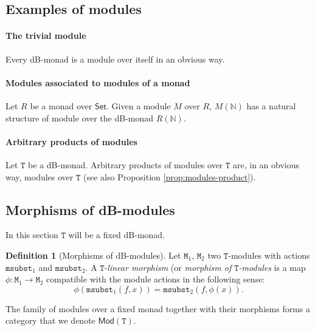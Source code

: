 \documentclass[a4paper,twoside,12pt]{article}
\theoremstyle{definition}
\newtheorem{definition}{Definition}
\theoremstyle{remark}
\newcommand{\NN}{\mathbb{N}}
\newcommand{\TT}{\mathtt{T}}
\newcommand{\MM}{\mathtt{M}}
\newcommand{\msubst}{\mathtt{msubst}}
\begin{document}
\subsection{Examples of modules}
\label{sec:examples-modules}

\paragraph{The trivial module}

Every dB-monad is a module over itself in an obvious way.

\paragraph{Modules associated to modules of a monad}

Let $R$ be a monad over $\mathsf{Set}$.  Given a module $M$ over $R$,
$M(\NN)$ has a natural structure of module over the dB-monad $R(\NN)$.

\paragraph{Arbitrary products of modules}

Let $\TT$ be a dB-monad.  Arbitrary products of modules over $\TT$
are, in an obvious way, modules over $\TT$ (see also Proposition
\ref{prop:modules-product}).

\subsection{Morphisms of dB-modules}
\label{sec:morphisms-db-modules}

In this section $\TT$ will be a fixed dB-monad.

\begin{definition}[Morphisms of dB-modules]
  Let $\MM_1$, $\MM_2$ two $\TT$-modules with actions $\msubst_1$ and
  $\msubst_2$.  A $\TT$-\emph{linear morphism} (or \emph{morphism of
    $\TT$-modules} is a map $\phi\colon \MM_1 \to \MM_2$ compatible
  with the module actions in the following sense:
  \begin{equation*}
    \phi(\msubst_1(f,x)) = \msubst_2(f,\phi(x)).
  \end{equation*}
\end{definition}

The family of modules over a fixed monad together with their morphisms
forms a category that we denote $\mathsf{Mod}(\TT)$.
\end{document}
